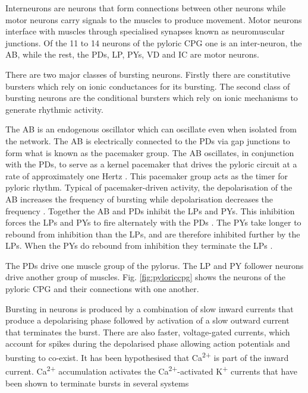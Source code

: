 Interneurons are neurons that form connections between other neurons while motor neurons carry signals to the muscles to produce movement. Motor neurons interface with muscles through specialised synapses known as neuromuscular junctions. Of the 11 to 14 neurons of the pyloric \ac{CPG} one is an inter-neuron, the \ac{AB}, while the rest, the \acp{PD}, \ac{LP}, \acp{PY}, \ac{VD} and \ac{IC} are motor neurons. 

There are two major classes of bursting neurons. Firstly there are constitutive bursters which rely on ionic conductances for its bursting. The second class of bursting neurons are the conditional bursters which rely on ionic mechanisms to generate rhythmic activity. 

The \ac{AB} is an endogenous oscillator which can oscillate even when isolated from the network. The \ac{AB} is electrically connected to the \acp{PD} via gap junctions \cite{Zhao2010} to form what is known as the pacemaker group. The \ac{AB} oscillates, in conjunction with the \acp{PD}, to serve as a kernel pacemaker that drives the pyloric circuit at a rate of approximately one Hertz \cite{Soto-Trevino2005, Abbott1991}. This pacemaker group acts as the timer for pyloric rhythm. Typical of pacemaker-driven activity, the depolarisation of the \ac{AB} increases the frequency of bursting while depolarisation decreases the frequency \cite{Selverston1985}. Together the \ac{AB} and \acp{PD} inhibit the \acp{LP} and \acp{PY}. This inhibition forces the \acp{LP} and \acp{PY} to fire alternately with the \acp{PD} \cite{Bargmann2013}. The \acp{PY} take longer to rebound from inhibition than the \acp{LP}, and are therefore inhibited further by the \acp{LP}. When the \acp{PY} do rebound from inhibition they terminate the \acp{LP} \cite{Marder2007}.

The \acp{PD} drive one muscle group of the pylorus. The  \ac{LP} and \ac{PY} follower neurons drive another group of muscles. Fig. \ref{fig:pyloriccpg} shows the neurons of the pyloric \ac{CPG} and their connections with one another.

Bursting in neurons is produced by a combination of slow inward currents that produce a depolarising phase followed by activation of a slow outward current that terminates the burst. There are also faster, voltage-gated currents, which account for spikes during the depolarised phase allowing action potentials and bursting to co-exist. It has been hypothesised that Ca\textsuperscript{2+} is part of the inward current. Ca\textsuperscript{2+} accumulation activates the Ca\textsuperscript{2+}-activated K\textsuperscript{+} currents that have been shown to terminate bursts in several systems \cite{Levi2003} %



